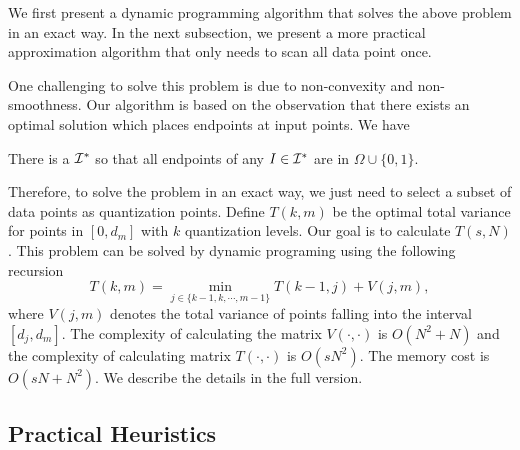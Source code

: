 We first present a dynamic programming algorithm
that solves the above problem in an exact way.
In the next subsection, we present a more practical
approximation algorithm that only needs to scan all
data point once.

One challenging to solve this problem is 
due to non-convexity and non-smoothness. 
Our algorithm is based on the observation that
there exists an optimal solution which places endpoints at input points. We have

\begin{lemma}
\label{lem:discrete}
There is a $\setI^*$ so that all endpoints of any $I \in \mathcal{I}^*$ are in $\Omega \cup \{0, 1\}$.
\end{lemma}


\iffalse
\begin{proof}
Fix any endpoint $b$ of intervals in $\setI^*$.
WLOG assume that $b \neq 0, 1$.
Then we must have $I = [a, b]$ and $I' = [b, c]$ for some $I, I' \in \setI^*$.
Observe that the choice of $b$ only affects the error for points in $I \cup I'$.
We have that $\err (\Omega, I) + \err (\Omega, I') $ is given by
\begin{align*}
& \sum_{x \in I} (b - x) (x - a) + \sum_{x \in I'} (c -x)(x - b) \\
&= A b + C \; ,
\end{align*}
where $A, C$ are constants which do not depend on $b$.
Hence, this is a linear objective in $b$.
Since $b$ can freely range between the rightmost point in $I$ and the leftmost point in $I'$, there is an optimizer for this solution at one of those two points.
Hence we may choose $b \in \Omega$.
\end{proof}
\fi


Therefore, to solve the problem in an exact way, we
just need to select a subset of data points as
quantization points. 
Define $T(k, m)$ be the optimal total variance for points in $[0, d_m]$ with $k$ quantization levels. Our goal is to calculate $T(s, N)$. This problem can be solved by dynamic programing using the following recursion
\[
T(k, m) = \min_{j\in \{k-1, k, \cdots, m-1\}} T(k-1,j) + V(j,m),
\]
where $V(j,m)$ denotes the total variance of points falling into the interval $[d_j, d_m]$. The complexity of calculating the matrix $V(\cdot, \cdot)$ is $O(N^2 + N)$ and the complexity of calculating matrix $T(\cdot, \cdot)$ is $O(sN^2)$. The  memory cost is $O(sN + N^2)$. 
We describe the details in the full version.

\vspace{-0.5em}
\subsection{Practical Heuristics}
\vspace{-0.5em}

